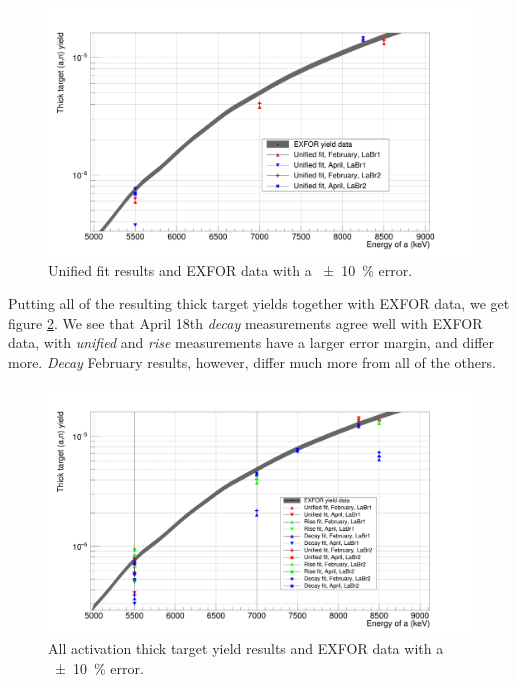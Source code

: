 \documentclass[a4paper,12pt]{report}
\begin{document}
\begin{figure}[H]
	\centering
	\includegraphics[width=\textwidth]{reactions_v_energy_unified.png}
	\caption{Unified fit results and EXFOR data with a \qty{\pm 10}{\percent} error.}
	\label{reactions_v_energy_unified}
\end{figure}

Putting all of the resulting thick target yields together with EXFOR data, we get figure \ref{reactions_v_energy}.
We see that April 18th \textit{decay} measurements agree well with EXFOR data, with \textit{unified} and \textit{rise} measurements have a larger error margin, and differ more.
\textit{Decay} February results, however, differ much more from all of the others.

\begin{figure}[H]
	\centering
	\includegraphics[width=\textwidth]{reactions_v_energy.png}
	\caption{All activation thick target yield results and EXFOR data with a \qty{\pm 10}{\percent} error.}
	\label{reactions_v_energy}
\end{figure}
\end{document}
